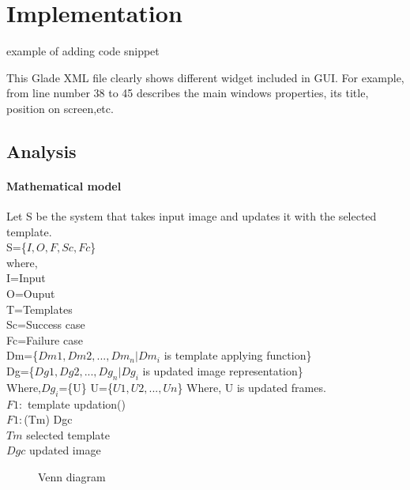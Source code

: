 
\chapter{Implementation}

example of adding code snippet

This Glade XML file clearly shows different widget included in GUI. For example, from line number 38 to 45 describes the main windows properties, its title, position on screen,etc.
\section{Analysis}
\subsubsection{Mathematical model}

Let S be the system that takes input image and updates it with the selected template.\\
S=\{$I,O,F,Sc,Fc$\}\\
where,\\
\indent I=Input\\
\indent O=Ouput\\
\indent T=Templates\\
\indent Sc=Success case\\
\indent Fc=Failure case\\

Dm=\{$Dm1,Dm2,...,Dm_{n}|Dm_{i}$ is template applying function\} \\
Dg=\{$Dg1,Dg2,...,Dg_{n}|Dg_{i}$ is updated image representation\} \\
\indent Where,$Dg_{i}$=\{U\} U=\{$U1,U2,...,Un$\} Where, U is updated frames.\\

\noindent $F1:$ template updation()\\
$F1:$(Tm) Dgc\\
$Tm$ selected template\\
$Dgc$ updated image\\

\begin{figure}[ht!]
\centering
{}
\caption{Venn diagram}
\end{figure}

